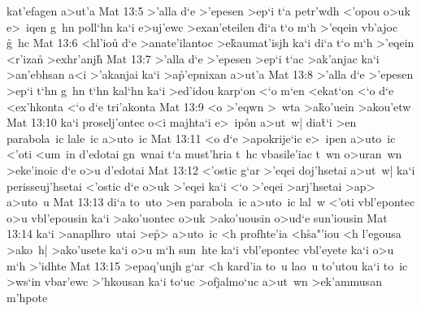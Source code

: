 kat'efagen
a>ut'a\bibvsend
\vs Mat 13:5
>'alla
d`e
>'epesen
>ep`i
t`a
petr'wdh
<'opou
o>uk
e>~iqen
g~hn
poll`hn
ka`i
e>uj'ewc
>exan'eteilen
\r{d}i`a
t`o
m`h
>'eqein
vb'ajoc
\r{g}~hc\bibvsend
{}
\vs Mat 13:6
<hl'iou\r{}
d`e
>anate'ilantoc
>e\r{k}aumat'isjh
ka`i
di`a
t`o
m`h
>'eqein
<r'iza\r{n}
>exhr'anj\r{h}\bibvsend
{}
\vs Mat 13:7
>'alla
d`e
>'epesen
>ep`i
t`ac
>ak'anjac
ka`i
>an'ebhsan
a<i
>'akanjai
ka`i
>a\r{p}'epnixan
a>ut'a\bibvsend
\vs Mat 13:8
>'alla
d`e
>'epesen
>ep`i
t`hn
g~hn
t`hn
kal`hn
ka`i
>ed'idou
karp`on
<`o
m`en
<ekat`on
<`o
d`e
<ex'hkonta
<`o
d`e
tri'akonta\bibvsend
\vs Mat 13:9
<o
>'eqwn
>~wta
>a\r{k}o'uein
>akou'etw\bibvsend
\vs Mat 13:10
ka`i
proselj'ontec
o<i
majhta`i
e>~ip\r{o}n
a>ut~w|
dia\r{t}`i
>en
parabola~ic
lale~ic
a>uto~ic\bibvsend
\vs Mat 13:11
<o
d`e
>apokrije`ic
e>~ipen
a>uto~ic
<'oti
<um~in
d'edotai
gn~wnai
t`a
must'hria
t~hc
vbasile'iac
t~wn
o>uran~wn
>eke'inoic
d`e
o>u
d'edotai\bibvsend
\vs Mat 13:12
<'ostic
g`ar
>'eqei
doj'hsetai
a>ut~w|
ka`i
perisseuj'hsetai
<'ostic
d`e
o>uk
>'eqei
ka`i
<`o
>'eqei
>arj'hsetai
>ap>
a>uto~u\bibvsend
\vs Mat 13:13
di`a
to~uto
>en
parabola~ic
a>uto~ic
lal~w
<'oti
vbl'epontec
o>u
vbl'epousin
ka`i
>ako'uontec
o>uk
>ako'uousin
o>ud`e
sun'iousin\bibvsend
\vs Mat 13:14
ka`i
>anaplhro~utai
>e\r{p}>
a>uto~ic
<h
profhte'ia
<h\r{s}a"'iou
<h
l'egousa
>ako~h|
>ako'usete
ka`i
o>u
m`h
sun~hte
ka`i
vbl'epontec
vbl'eyete
ka`i
o>u
m`h
>'idhte\bibvsend
\vs Mat 13:15
>epaq'unjh
g`ar
<h
kard'ia
to~u
lao~u
to'utou
ka`i
to~ic
>ws`in
vbar'ewc
>'hkousan
ka`i
to`uc
>ofjalmo`uc
a>ut~wn
>ek'ammusan
m'hpote
